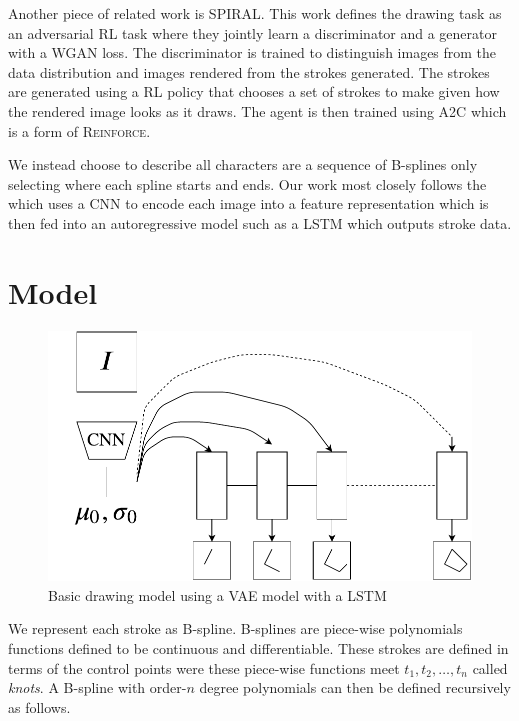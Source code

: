 \documentclass{article}
\begin{document}
Another piece of related work is
SPIRAL\citet{ganin2018synthesizing,mellor2019unsupervised}. This work
defines the drawing task as an adversarial RL task where they jointly
learn a discriminator and a generator with a WGAN loss. The
discriminator is trained to distinguish images from the data distribution
and images rendered from the strokes generated. The strokes are generated
using a RL policy that chooses a set of strokes to make given how the
rendered image looks as it draws. The agent is then trained using A2C
which is a form of \textsc{Reinforce}.

We instead choose to describe all characters are a sequence of
B-splines only selecting where each spline starts and ends. Our work
most closely follows the \citet{ha2017neural,chen2017sketch} which uses a CNN to
encode each image into a feature representation which is then fed into an
autoregressive model such as a LSTM which outputs stroke data.

\section{Model}
 
\begin{figure}[htb!]
\centering
\includegraphics[scale=0.5]{omnisynthfig1.pdf}
\caption{Basic drawing model using a VAE model with a LSTM}
\label{fig:basicmodel}
\end{figure}

    
We represent each stroke as B-spline. B-splines are piece-wise polynomials functions defined to be
continuous and differentiable. These strokes are defined in terms of the control points were these
piece-wise functions meet $t_1, t_2, \ldots, t_n$ called \emph{knots}. A B-spline with order-$n$
degree polynomials can then be defined recursively as follows.
\end{document}
